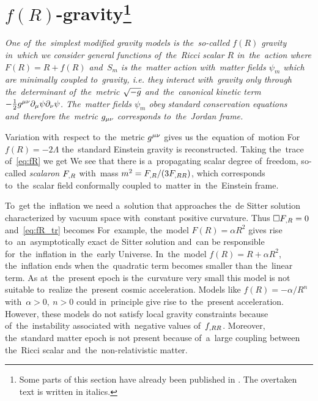 \section[$f(R)$-gravity]{$f(R)$-gravity\footnote{Some parts of this section have already been published in \textcite{mastersthesis_vrastil}. The overtaken text is written in italics.}}
\label{sec:fR}
{\itshape
One of~the~simplest modified gravity models is the~so-called $f(R)$ gravity in~which we consider general functions of~the~Ricci scalar $R$ in~the~action
where $F(R)=R+f(R)$ and~$S_m$ is the~matter action with~matter fields $\psi_m$ which are minimally coupled to~gravity, i.e. they interact with~gravity only through the~determinant of~the~metric $\sqrt{-g}$ and~the~canonical kinetic term $-\frac12g^{\mu\nu}\partial_\mu\psi\partial_\nu\psi$. The~matter fields $\psi_m$ obey standard conservation equations and~therefore the~metric $g_{\mu\nu}$ corresponds to~the~Jordan frame.

Variation with~respect to~the~metric $g^{\mu\nu}$ gives us the~equation of~motion
For~$f(R)=-2\Lambda$ the~standard Einstein gravity is reconstructed. Taking the~trace of~\eqref{eq:fR} we get
We see that there is a~propagating scalar degree of~freedom, so-called \textit{scalaron} $F_{,R}$ with~mass $m^2=F_{,R}/(3F_{,RR})$, which corresponds to~the~scalar field conformally coupled to~matter in~the~Einstein frame.

To~get the~inflation we need a~solution that approaches the~de Sitter solution characterized by vacuum space with~constant positive curvature. Thus $\Box F_{,R}=0$ and~\eqref{eq:fR_tr} becomes
For~example, the~model $F(R)=\alpha R^2$ gives rise to~an~asymptotically exact de Sitter solution and~can be responsible for~the~inflation in~the~early Universe. In~the~model $f(R) = R + \alpha R^2$, the~inflation ends when the~quadratic term becomes smaller than the~linear term. As at~the~present epoch is the~curvature very small this model is not suitable to~realize the~present cosmic acceleration. Models like $f(R)=-\alpha/R^n$ with~$\alpha>0,\ n>0$ could in~principle give rise to~the~present acceleration. However, these models do not satisfy local gravity constraints because of~the~instability associated with~negative values of~$f_{,RR}$. Moreover, the~standard matter epoch is not present because of~a~large coupling between the~Ricci scalar and~the~non-relativistic matter.

}
